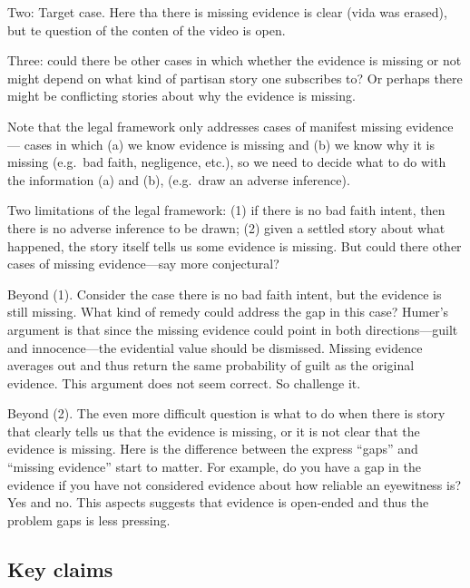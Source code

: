 \documentclass[
  10pt,
  dvipsnames,enabledeprecatedfontcommands]{scrartcl}
\begin{document}
Two: Target case. Here tha there is missing evidence is clear (vida was
erased), but te question of the conten of the video is open.

Three: could there be other cases in which whether the evidence is
missing or not might depend on what kind of partisan story one
subscribes to? Or perhaps there might be conflicting stories about why
the evidence is missing.

Note that the legal framework only addresses cases of manifest missing
evidence --- cases in which (a) we know evidence is missing and (b) we
know why it is missing (e.g.~bad faith, negligence, etc.), so we need to
decide what to do with the information (a) and (b), (e.g.~draw an
adverse inference).

Two limitations of the legal framework: (1) if there is no bad faith
intent, then there is no adverse inference to be drawn; (2) given a
settled story about what happened, the story itself tells us some
evidence is missing. But could there other cases of missing
evidence---say more conjectural?

Beyond (1). Consider the case there is no bad faith intent, but the
evidence is still missing. What kind of remedy could address the gap in
this case? Humer's argument is that since the missing evidence could
point in both directions---guilt and innocence---the evidential value
should be dismissed. Missing evidence averages out and thus return the
same probability of guilt as the original evidence. This argument does
not seem correct. So challenge it.

Beyond (2). The even more difficult question is what to do when there is
story that clearly tells us that the evidence is missing, or it is not
clear that the evidence is missing. Here is the difference between the
express ``gaps'' and ``missing evidence'' start to matter. For example,
do you have a gap in the evidence if you have not considered evidence
about how reliable an eyewitness is? Yes and no. This aspects suggests
that evidence is open-ended and thus the problem gaps is less pressing.

\hypertarget{key-claims}{%
\subsection{Key claims}\label{key-claims}}
\end{document}
